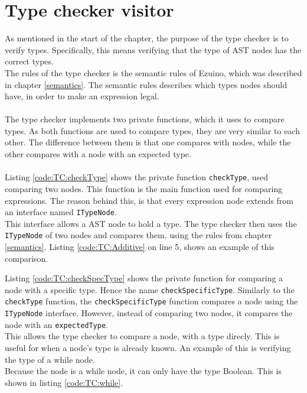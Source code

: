 \section{Type checker visitor}
As mentioned in the start of the chapter, the purpose of the type checker is to verify types. Specifically, this means verifying that the type of AST nodes has the correct types.\\
The rules of the type checker is the semantic rules of Ezuino, which was described in chapter \ref{semantics}. The semantic rules describes which types nodes should have, in order to make an expression legal.
\\\\
The type checker implements two private functions, which it uses to compare types. As both functions are used to compare types, they are very similar to each other. The difference between them is that one compares with nodes, while the other compares with a node with an expected type.
\\\\
Listing \ref{code:TC:checkType} shows the private function \texttt{checkType}, used comparing two nodes. This function is the main function used for comparing expressions. The reason behind this, is that every expression node extends from an interface named \texttt{ITypeNode}.\\
This interface allows a AST node to hold a type. The type checker then uses the \texttt{ITypeNode} of two nodes and compares them, using the rules from chapter \ref{semantics}. Listing \ref{code:TC:Additive} on line 5, shows an example of this comparison.\\

\noindent\newline

\noindent\newline

Listing \ref{code:TC:checkSpecType} shows the private function for comparing a node with a specific type. Hence the name \texttt{checkSpecificType}. Similarly to the \texttt{checkType} function, the \texttt{checkSpecificType} function compares a node using the \texttt{ITypeNode} interface. However, instead of comparing two nodes, it compares the node with an \texttt{expectedType}.\\
This allows the type checker to compare a node, with a type direcly. This is useful for when a node's type is already known. An example of this is verifying the type of a while node.\\
Because the node is a while node, it can only have the type Boolean. This is shown in listing \ref{code:TC:while}.\\

\noindent\newline

\noindent\newline


